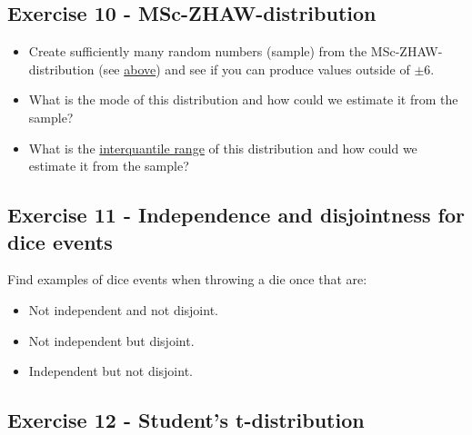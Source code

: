 \documentclass[
]{book}
\providecommand{\tightlist}{%
  \setlength{\itemsep}{0pt}\setlength{\parskip}{0pt}}
\begin{document}
\subsection{Exercise 10 - MSc-ZHAW-distribution}\label{exercise10}

\begin{itemize}
\tightlist
\item
  Create sufficiently many random numbers (sample) from the MSc-ZHAW-distribution (see \hyperref[discrete_probability_distributions]{above})
  and see if you can produce values outside of \(\pm 6\).
\item
  What is the mode of this distribution and how could we estimate it from the sample?
\item
  What is the \href{https://en.wikipedia.org/wiki/Interquartile_range}{interquantile range} of this distribution and how could we estimate it from the sample?
\end{itemize}

\subsection{Exercise 11 - Independence and disjointness for dice events}\label{exercise11}

Find examples of dice events when throwing a die once that are:

\begin{itemize}
\tightlist
\item
  Not independent and not disjoint.
\item
  Not independent but disjoint.
\item
  Independent but not disjoint.
\end{itemize}

\subsection{Exercise 12 - Student's t-distribution}\label{exercise12}
\end{document}
